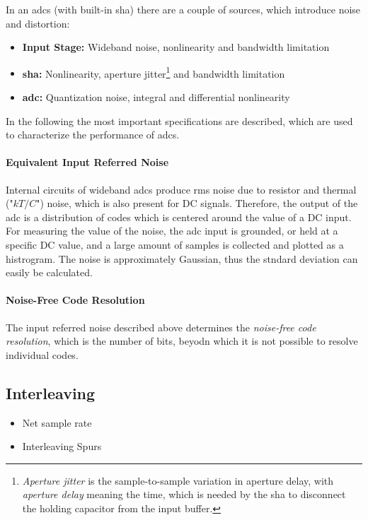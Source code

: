 In an \glspl{adc} (with built-in \gls{sha}) there are a couple of sources, which introduce noise and distortion:
\begin{itemize}
	\item \textbf{Input Stage:} Wideband noise, nonlinearity and bandwidth limitation
	\item \textbf{\gls{sha}:} Nonlinearity, aperture jitter\footnote{\textit{Aperture jitter} is the sample-to-sample variation in aperture delay, with \textit{aperture delay} meaning the time, which is needed by the \gls{sha} to disconnect the holding capacitor from the input buffer.} and bandwidth limitation
	\item \textbf{\gls{adc}:} Quantization noise, integral and differential nonlinearity
\end{itemize}
In the following the most important specifications are described, which are used to characterize the performance of \glspl{adc}.



\paragraph{Equivalent Input Referred Noise}
Internal circuits of wideband \glspl{adc} produce rms noise due to resistor and thermal ("$kT/C$") noise, which is also present for DC signals. Therefore, the output of the \gls{adc} is a distribution of codes which is centered around the value of a DC input. For measuring the value of the noise, the \gls{adc} input is grounded, or held at a specific DC value, and a large amount of samples is collected and plotted as a histrogram. The noise is approximately Gaussian, thus the stndard deviation can easily be calculated.

\paragraph{Noise-Free Code Resolution}
The input referred noise described above determines the \textit{noise-free code resolution}, which is the number of bits, beyodn which it is not possible to resolve individual codes.
\cite{walt}


\subsection{Interleaving}

\begin{itemize}
\item Net sample rate
\item Interleaving Spurs
\end{itemize}

\cite{mangrob}




\newpage
